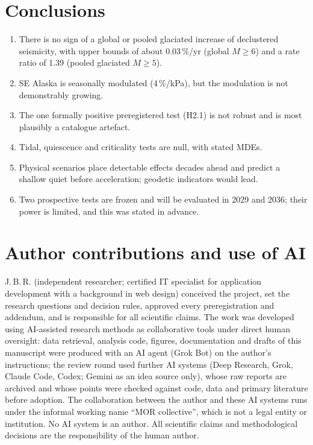 \documentclass[11pt,a4paper]{article}
\begin{document}
\section{Conclusions}
\label{sec:conclusions}
\begin{enumerate}
  \item There is no sign of a global or pooled glaciated increase of declustered seismicity, with upper bounds of about 0.03\,\%/yr (global $M\geq6$) and a rate ratio of 1.39 (pooled glaciated $M\geq5$).
  \item SE Alaska is seasonally modulated (4\,\%/kPa), but the modulation is not demonstrably growing.
  \item The one formally positive preregistered test (H2.1) is not robust and is most plausibly a catalogue artefact.
  \item Tidal, quiescence and criticality tests are null, with stated MDEs.
  \item Physical scenarios place detectable effects decades ahead and predict a shallow quiet before acceleration; geodetic indicators would lead.
  \item Two prospective tests are frozen and will be evaluated in 2029 and 2036; their power is limited, and this was stated in advance.
\end{enumerate}

\section*{Author contributions and use of AI}
J.\,B.\,R. (independent researcher; certified IT specialist for application development with a background in web design) conceived the project, set the research questions and decision rules, approved every preregistration and addendum, and is responsible for all scientific claims. The work was developed using AI-assisted research methods as collaborative tools under direct human oversight: data retrieval, analysis code, figures, documentation and drafts of this manuscript were produced with an AI agent (Grok Bot) on the author's instructions; the review round used further AI systems (Deep Research, Grok, Claude Code, Codex; Gemini as an idea source only), whose raw reports are archived and whose points were checked against code, data and primary literature before adoption. The collaboration between the author and these AI systems runs under the informal working name ``MOR collective'', which is not a legal entity or institution. No AI system is an author. All scientific claims and methodological decisions are the responsibility of the human author.
\end{document}
